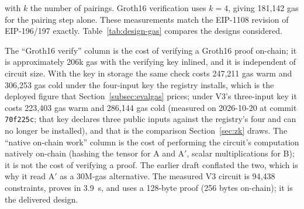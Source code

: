 \documentclass[11pt,a4paper]{article}
\numberwithin{equation}{section}
\numberwithin{table}{section}
\begin{document}
with $k$ the number of pairings. Groth16 verification uses $k = 4$, giving 181{,}142 gas for the pairing step alone. These measurements match the EIP-1108 revision of EIP-196/197 exactly. Table~\ref{tab:design-gas} compares the designs considered.

\begin{table}[H]
\centering
\caption{Verification cost per design: soundness, constraint count, proof size, Groth16 verification gas, and native on-chain work.}
\label{tab:design-gas}
\end{table}

The ``Groth16 verify'' column is the cost of verifying a Groth16 proof on-chain; it is approximately 206k gas with the verifying key inlined, and it is independent of circuit size. With the key in storage the same check costs 247,211 gas warm and 306{,}253 gas cold under the four-input key the registry installs, which is the deployed figure that Section~\ref{subsec:evalgas} prices; under V3's three-input key it costs 223,403 gas warm and 286,144 gas cold (measured on 2026-10-20 at commit \texttt{70f225c}; that key declares three public inputs against the registry's four and can no longer be installed), and that is the comparison Section~\ref{sec:zk} draws. The ``native on-chain work'' column is the cost of performing the circuit's computation natively on-chain (hashing the tensor for A and A$'$, scalar multiplications for B); it is not the cost of verifying a proof. The earlier draft conflated the two, which is why it read A$'$ as a 30M-gas alternative. The measured V3 circuit is 94{,}438 constraints, proves in 3.9~s, and uses a 128-byte proof (256 bytes on-chain); it is the delivered design.
\end{document}
